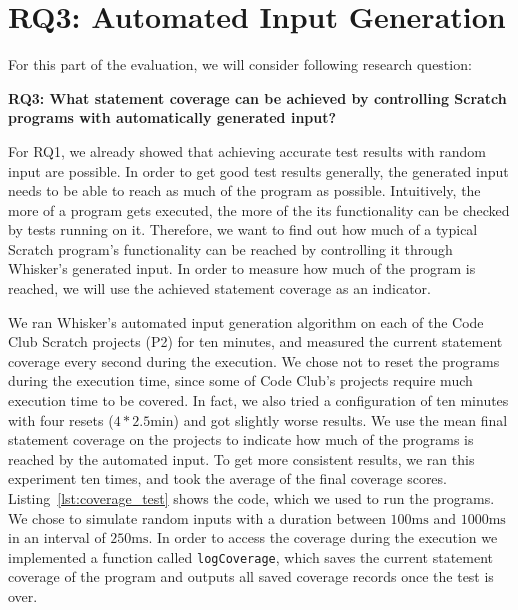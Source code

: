 \section{RQ3: Automated Input Generation}
\label{sec:rq3}

For this part of the evaluation, we will consider following research question:

\begin{center}\begin{minipage}{.9\textwidth}
    \textbf{RQ3: What statement coverage can be achieved by controlling Scratch programs with automatically generated input?}
\end{minipage}\end{center}

\noindent For RQ1, we already showed that achieving accurate test results with random input are possible.
In order to get good test results generally, the generated input needs to be able to reach as much of the program as possible.
Intuitively, the more of a program gets executed, the more of the its functionality can be checked by tests running on it.
Therefore, we want to find out how much of a typical Scratch program's functionality can be reached by controlling it through Whisker's generated input.
In order to measure how much of the program is reached, we will use the achieved statement coverage as an indicator.
\parspace

We ran Whisker's automated input generation algorithm on each of the Code Club Scratch projects (P2) for ten minutes,
and measured the current statement coverage every second during the execution.
We chose not to reset the programs during the execution time,
since some of Code Club's projects require much execution time to be covered.
In fact, we also tried a configuration of ten minutes with four resets ($4 * 2.5\text{min}$)
and got slightly worse results.
We use the mean final statement coverage on the projects to indicate how much of the programs is reached by the automated input.
To get more consistent results, we ran this experiment ten times, and took the average of the final coverage scores.
Listing~\ref{lst:coverage_test} shows the code, which we used to run the programs.
We chose to simulate random inputs with a duration between $100\text{ms}$ and $1000\text{ms}$ in an interval of $250\text{ms}$.
In order to access the coverage during the execution we implemented a function called \texttt{logCoverage},
which saves the current statement coverage of the program and outputs all saved coverage records once the test is over.
\parspace

